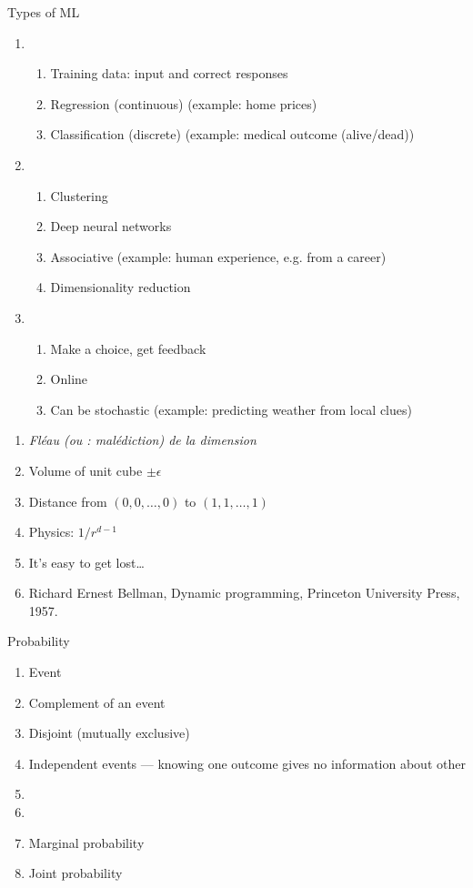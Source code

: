 Types of ML
\begin{enumerate}
\item {}
  \begin{enumerate}
  \item Training data: input and correct responses
  \item Regression (continuous) (example: home prices)
  \item Classification (discrete) (example: medical outcome (alive/dead))
  \end{enumerate}
\item {}
  \begin{enumerate}
  \item Clustering
  \item Deep neural networks
  \item Associative (example: human experience, e.g. from a career)
  \item Dimensionality reduction
  \end{enumerate}
\item {}
  \begin{enumerate}
  \item Make a choice, get feedback
  \item Online
  \item Can be stochastic (example: predicting weather from local clues)
  \end{enumerate}
\end{enumerate}

\begin{enumerate}
\item \textit{Fléau (ou : malédiction) de la dimension}
\item Volume of unit cube $\pm\epsilon$
\item Distance from $(0,0,\ldots,0)$ to $(1,1,\ldots,1)$
\item Physics: $1/r^{d-1}$
\item It's easy to get lost\dots
\item Richard Ernest Bellman, Dynamic programming, Princeton
  University Press, 1957.
\end{enumerate}

Probability
\begin{enumerate}
\item Event
\item Complement of an event
\item Disjoint (mutually exclusive)
\item Independent events --- knowing one outcome gives no information about other
\item {}
\item {}
\item Marginal probability
\item Joint probability
\end{enumerate}

